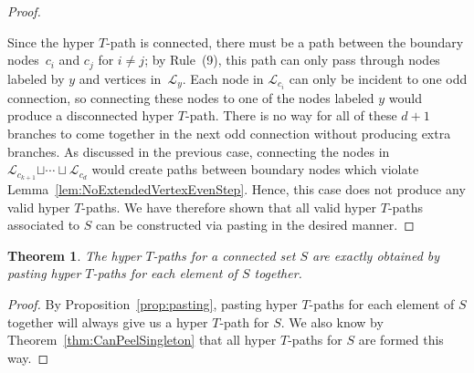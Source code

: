 \documentclass[pdftex]{sigma}
\numberwithin{equation}{section}
\newtheorem{Theorem}{Theorem}[section]
\newcommand{\new}[1]{{#1}}
\begin{document}
\begin{proof}
\begin{center}
\end{center}
Since the hyper $T$-path is connected, there must be a path between the boundary nodes~$c_i$ and $c_j$ for $i \neq j$; by Rule~(9), this path can only pass through nodes labeled by $y$ and vertices in~$\mathcal{L}_{y}$. Each node in $\mathcal{L}_{c_i}$ can only be incident to one odd connection, so connecting these nodes to one of the nodes labeled $y$ would produce a disconnected hyper $T$-path. There is no way for all of these $d+1$ branches to come together in the next odd connection without producing extra branches. As discussed in the previous case, connecting the nodes in $\mathcal{L}_{c_{k+1}} \new{\sqcup \cdots \sqcup} \mathcal{L}_{c_d}$ would create paths between boundary nodes which violate Lemma~\ref{lem:NoExtendedVertexEvenStep}. Hence, this case does not produce any valid hyper $T$-paths.
We have therefore shown that all valid hyper $T$-paths associated to $S$ can be constructed via pasting in the desired manner.
\end{proof}
\begin{Theorem}
The hyper $T$-paths for a connected set $S$ are exactly obtained by pasting hyper $T$-paths for each element of $S$ together.
\end{Theorem}
\begin{proof}
By Proposition~\ref{prop:pasting}, pasting hyper $T$-paths for each element of $S$ together will always give us a hyper $T$-path for $S$. We also know by Theorem~\ref{thm:CanPeelSingleton} that all hyper $T$-paths for $S$ are formed this way.
\end{proof}
\end{document}
